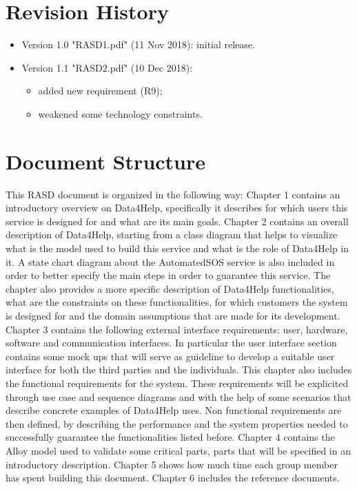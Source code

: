 \section{Revision History}

\begin{itemize}
\item Version 1.0 "RASD1.pdf" (11 Nov 2018): initial release.
\item Version 1.1 "RASD2.pdf" (10 Dec 2018): 
	\begin{itemize}
	\item added new requirement (R9);
	\item weakened some technology constraints.
	\end{itemize}
\end{itemize}

\section{Document Structure}
This RASD document is organized in the following way:
Chapter 1 contains an introductory overview on Data4Help, specifically it describes for which users this service is designed for and what are its main goals.
\givespace
Chapter 2 contains an overall description of Data4Help, starting from a class diagram that helps to visualize what is the model used to build this service and what is the role of Data4Help in it. A state chart diagram about the AutomatedSOS service is also included in order to better specify the main steps in order to guarantee this service. The chapter also provides a more specific description of Data4Help functionalities, what are the constraints on these functionalities, for which customers the system is designed for and the domain assumptions that are made for its development.
\givespace
Chapter 3 contains the following external interface requirements: user, hardware, software and communication interfaces. In particular the user interface section contains some mock ups that will serve as guideline to develop a suitable user interface for both the third parties and the individuals. 
This chapter also includes the functional requirements for the system. These requirements will be explicited through use case and sequence diagrams and with the help of some scenarios that describe concrete examples of Data4Help uses.
Non functional requirements are then defined, by describing the performance and the system properties needed to successfully guarantee the functionalities listed before.
\givespace
Chapter 4 contains the Alloy model used to validate some critical parts, parts that will be specified in an introductory description.
\givespace
Chapter 5 shows how much time each group member has spent building this document.
\givespace
Chapter 6 includes the reference documents.